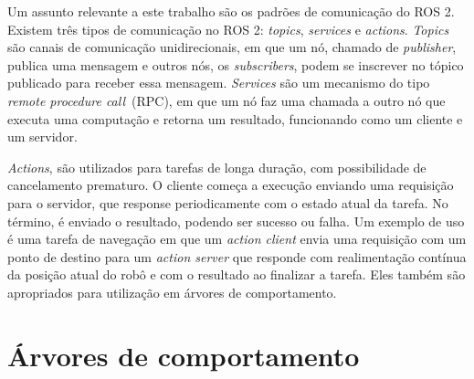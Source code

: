 \documentclass[repeatfields,xlists,xpacks,oneside,yearsonly]{ufrgscca}
\begin{document}
Um assunto relevante a este trabalho são os padrões de comunicação do
ROS 2. Existem três tipos de comunicação no ROS 2: \textit{topics},
\textit{services} e \textit{actions}. \textit{Topics} são canais de
comunicação unidirecionais, em que um nó, chamado de
\textit{publisher}, publica uma mensagem e outros nós, os
\textit{subscribers}, podem se inscrever no tópico publicado para
receber essa mensagem. \textit{Services} são um mecanismo do tipo
\textit{remote procedure call}~(RPC), em que um nó faz uma chamada a
outro nó que executa uma computação e retorna um resultado,
funcionando como um cliente e um servidor.

\textit{Actions}, são utilizados para tarefas de longa duração, com possibilidade de
cancelamento prematuro.
O cliente começa a execução enviando uma requisição para o servidor,
que response periodicamente com o estado atual da tarefa.
No término, é enviado o resultado, podendo ser sucesso ou falha.
Um exemplo de uso é uma tarefa de navegação em que um \textit{action client}
envia uma requisição com um ponto de destino para um \textit{action server}
que responde com realimentação contínua da posição atual do robô e
com o resultado ao finalizar a tarefa.
Eles também são apropriados para utilização em árvores de comportamento.

\section{Árvores de comportamento}


\end{document}
